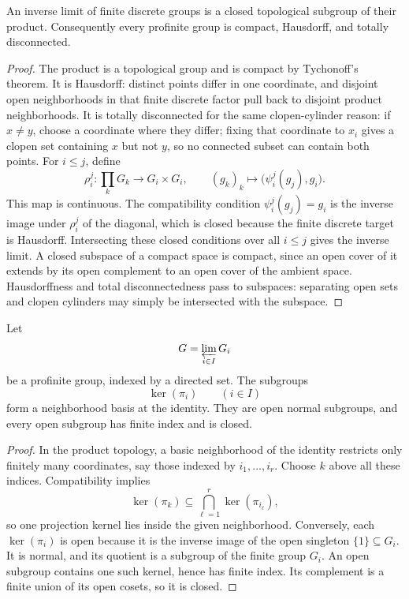 \begin{proposition}
An inverse limit of finite discrete groups is a closed topological subgroup of
their product.  Consequently every profinite group is compact, Hausdorff, and
totally disconnected.
\end{proposition}
\begin{proof}
The product is a topological group and is compact by Tychonoff's theorem.  It
is Hausdorff: distinct points differ in one coordinate, and disjoint open
neighborhoods in that finite discrete factor pull back to disjoint product
neighborhoods.  It is totally disconnected for the same clopen-cylinder
reason: if \(x\ne y\), choose a coordinate where they differ; fixing that
coordinate to \(x_i\) gives a clopen set containing \(x\) but not \(y\), so
no connected subset can contain both points.  For \(i\leq j\), define
\[
\rho_i^j:\prod_kG_k\longrightarrow G_i\times G_i,
\qquad
(g_k)_k\longmapsto\bigl(\psi_i^j(g_j),g_i\bigr).
\]
This map is continuous.  The compatibility condition
\(\psi_i^j(g_j)=g_i\) is the inverse image under \(\rho_i^j\) of the
diagonal, which is closed because the finite discrete target is Hausdorff.
Intersecting these closed conditions over all \(i\leq j\) gives the inverse
limit.  A closed subspace of a compact space is compact, since an open cover
of it extends by its open complement to an open cover of the ambient space.
Hausdorffness and total disconnectedness pass to subspaces: separating open
sets and clopen cylinders may simply be intersected with the subspace.
\end{proof}

\begin{proposition}\label{prop:profinite-open-subgroups}
Let
\[
G=\varprojlim_{i\in I}G_i
\]
be a profinite group, indexed by a directed set.  The subgroups
\[
\ker(\pi_i)\qquad(i\in I)
\]
form a neighborhood basis at the identity.  They are open normal subgroups,
and every open subgroup has finite index and is closed.
\end{proposition}
\begin{proof}
In the product topology, a basic neighborhood of the identity restricts only
finitely many coordinates, say those indexed by \(i_1,\ldots,i_r\).  Choose
\(k\) above all these indices.  Compatibility implies
\[
\ker(\pi_k)\subseteq
\bigcap_{\ell=1}^r\ker(\pi_{i_\ell}),
\]
so one projection kernel lies inside the given neighborhood.  Conversely,
each \(\ker(\pi_i)\) is open because it is the inverse image of the open
singleton \(\{1\}\subseteq G_i\).  It is normal, and its quotient is a
subgroup of the finite group \(G_i\).  An open subgroup contains one such
kernel, hence has finite index.  Its complement is a finite union of its open
cosets, so it is closed.
\end{proof}

